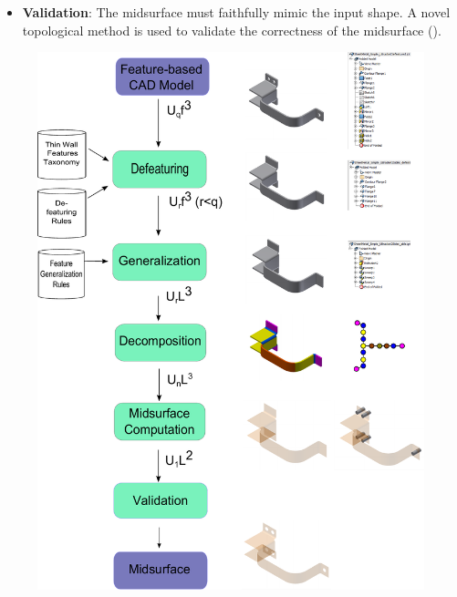 \begin{itemize}[noitemsep,topsep=2pt,parsep=2pt,partopsep=2pt,leftmargin=*]
\item \textbf{Validation}: The midsurface must faithfully mimic the input shape. A novel topological method is used to validate the correctness of the midsurface (\cite{YogeshCADandA2015}).

\end{itemize}


	\begin{figure}[ht]
	\centering 
	\includegraphics[width=0.95\linewidth]{images/SystemArchitecture3.pdf}
	\label{fig_sysarch}
	\end{figure}

